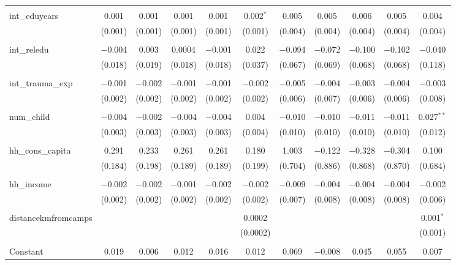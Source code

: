 \begin{table}[H]
\begin{tabular}{@{\extracolsep{4pt}}lcccccccccc}
  & & & & & & & & & & \\ 
 int\_eduyears & 0.001 & 0.001 & 0.001 & 0.001 & 0.002$^{*}$ & 0.005 & 0.005 & 0.006 & 0.005 & 0.004 \\ 
  & (0.001) & (0.001) & (0.001) & (0.001) & (0.001) & (0.004) & (0.004) & (0.004) & (0.004) & (0.004) \\ 
  & & & & & & & & & & \\ 
 int\_reledu & $-$0.004 & 0.003 & 0.0004 & $-$0.001 & 0.022 & $-$0.094 & $-$0.072 & $-$0.100 & $-$0.102 & $-$0.040 \\ 
  & (0.018) & (0.019) & (0.018) & (0.018) & (0.037) & (0.067) & (0.069) & (0.068) & (0.068) & (0.118) \\ 
  & & & & & & & & & & \\ 
 int\_trauma\_exp & $-$0.001 & $-$0.002 & $-$0.001 & $-$0.001 & $-$0.002 & $-$0.005 & $-$0.004 & $-$0.003 & $-$0.004 & $-$0.003 \\ 
  & (0.002) & (0.002) & (0.002) & (0.002) & (0.002) & (0.006) & (0.007) & (0.006) & (0.006) & (0.008) \\ 
  & & & & & & & & & & \\ 
 num\_child & $-$0.004 & $-$0.002 & $-$0.004 & $-$0.004 & 0.004 & $-$0.010 & $-$0.010 & $-$0.011 & $-$0.011 & 0.027$^{**}$ \\ 
  & (0.003) & (0.003) & (0.003) & (0.003) & (0.004) & (0.010) & (0.010) & (0.010) & (0.010) & (0.012) \\ 
  & & & & & & & & & & \\ 
 hh\_cons\_capita & 0.291 & 0.233 & 0.261 & 0.261 & 0.180 & 1.003 & $-$0.122 & $-$0.328 & $-$0.304 & 0.100 \\ 
  & (0.184) & (0.198) & (0.189) & (0.189) & (0.199) & (0.704) & (0.886) & (0.868) & (0.870) & (0.684) \\ 
  & & & & & & & & & & \\ 
 hh\_income & $-$0.002 & $-$0.002 & $-$0.001 & $-$0.002 & $-$0.002 & $-$0.009 & $-$0.004 & $-$0.004 & $-$0.004 & $-$0.002 \\ 
  & (0.002) & (0.002) & (0.002) & (0.002) & (0.002) & (0.007) & (0.008) & (0.008) & (0.008) & (0.006) \\ 
  & & & & & & & & & & \\ 
 distancekmfromcamps &  &  &  &  & 0.0002 &  &  &  &  & 0.001$^{*}$ \\ 
  &  &  &  &  & (0.0002) &  &  &  &  & (0.001) \\ 
  & & & & & & & & & & \\ 
 Constant & 0.019 & 0.006 & 0.012 & 0.016 & 0.012 & 0.069 & $-$0.008 & 0.045 & 0.055 & 0.007 \\ 

\end{tabular}
\end{table}
